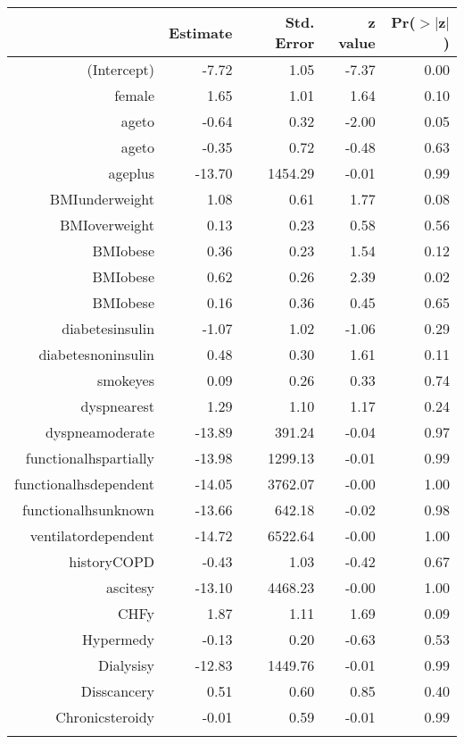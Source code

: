 \bigskip\bigskip
\centering
\begin{tabular}{rrrrr}
  \hline
 & Estimate & Std. Error & z value & Pr($>$$|$z$|$) \\ 
  \hline
(Intercept) & -7.72 & 1.05 & -7.37 & 0.00 \\ 
  female & 1.65 & 1.01 & 1.64 & 0.10 \\ 
  age\-65\-to\-74 & -0.64 & 0.32 & -2.00 & 0.05 \\ 
  age\-75\-to\-84 & -0.35 & 0.72 & -0.48 & 0.63 \\ 
  age\-85\-plus & -13.70 & 1454.29 & -0.01 & 0.99 \\ 
  BMI\-underweight & 1.08 & 0.61 & 1.77 & 0.08 \\ 
  BMI\-overweight & 0.13 & 0.23 & 0.58 & 0.56 \\ 
  BMI\-obese\-1 & 0.36 & 0.23 & 1.54 & 0.12 \\ 
  BMI\-obese\-2 & 0.62 & 0.26 & 2.39 & 0.02 \\ 
  BMI\-obese\-3 & 0.16 & 0.36 & 0.45 & 0.65 \\ 
  diabetes\-insulin & -1.07 & 1.02 & -1.06 & 0.29 \\ 
  diabetes\-noninsulin & 0.48 & 0.30 & 1.61 & 0.11 \\ 
  smoke\-yes & 0.09 & 0.26 & 0.33 & 0.74 \\ 
  dyspnea\-rest & 1.29 & 1.10 & 1.17 & 0.24 \\ 
  dyspnea\-moderate & -13.89 & 391.24 & -0.04 & 0.97 \\ 
  functional\-hs\-partially & -13.98 & 1299.13 & -0.01 & 0.99 \\ 
  functional\-hs\-dependent & -14.05 & 3762.07 & -0.00 & 1.00 \\ 
  functional\-hs\-unknown & -13.66 & 642.18 & -0.02 & 0.98 \\ 
  ventilator\-dependent & -14.72 & 6522.64 & -0.00 & 1.00 \\ 
  history\-COPD & -0.43 & 1.03 & -0.42 & 0.67 \\ 
  ascites\-y & -13.10 & 4468.23 & -0.00 & 1.00 \\ 
  CHF\-y & 1.87 & 1.11 & 1.69 & 0.09 \\ 
  Hyper\-med\-y & -0.13 & 0.20 & -0.63 & 0.53 \\ 
  Dialysis\-y & -12.83 & 1449.76 & -0.01 & 0.99 \\ 
  Diss\-cancer\-y & 0.51 & 0.60 & 0.85 & 0.40 \\ 
  Chronic\-steroid\-y & -0.01 & 0.59 & -0.01 & 0.99 \\ 
$$
\end{tabular}
